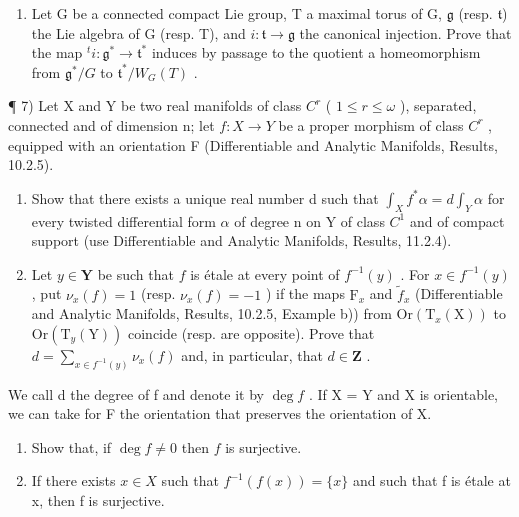 \begin{enumerate}
\def\labelenumi{\arabic{enumi})}
\setcounter{enumi}{5}
\tightlist
\item
  Let G be a connected compact Lie group, T a maximal torus of G, \(\mathfrak{g}\) (resp. \(\mathfrak{t}\)) the Lie algebra of G (resp. T), and \(i : \mathfrak{t} \to \mathfrak{g}\) the canonical injection. Prove that the map \(^{t}i : \mathfrak{g}^{*} \to \mathfrak{t}^{*}\) induces by passage to the quotient a homeomorphism from \(\mathfrak{g}^{*}/G\) to \(\mathfrak{t}^{*}/W_{G}(T)\) .
\end{enumerate}

¶ 7) Let X and Y be two real manifolds of class \(C^{r}\) ( \(1 \leq r \leq \omega\) ), separated, connected and of dimension n; let \(f : X \to Y\) be a proper morphism of class \(C^{r}\) , equipped with an orientation F (Differentiable and Analytic Manifolds, Results, 10.2.5).

\begin{enumerate}
\def\labelenumi{\alph{enumi})}
\item
  Show that there exists a unique real number d such that \(\int_{X} f^{*}\alpha = d\int_{Y}\alpha\) for every twisted differential form \(\alpha\) of degree n on Y of class \(C^{1}\) and of compact support (use Differentiable and Analytic Manifolds, Results, 11.2.4).
\item
  Let \(y \in \mathbf{Y}\) be such that \(f\) is étale at every point of \(f^{-1}(y)\) . For \(x \in f^{-1}(y)\) , put \(\nu_x(f) = 1\) (resp. \(\nu_x(f) = -1\) ) if the maps \(\mathrm{F}_x\) and \(\tilde{f}_x\) (Differentiable and Analytic Manifolds, Results, 10.2.5, Example b)) from \(\mathrm{Or}(\mathrm{T}_x(\mathrm{X}))\) to \(\mathrm{Or}(\mathrm{T}_y(\mathrm{Y}))\) coincide (resp. are opposite). Prove that \(d = \sum_{x \in f^{-1}(y)} \nu_x(f)\) and, in particular, that \(d \in \mathbf{Z}\) .
\end{enumerate}

We call d the degree of f and denote it by \(\deg f\) . If X = Y and X is orientable, we can take for F the orientation that preserves the orientation of X.

\begin{enumerate}
\def\labelenumi{\alph{enumi})}
\setcounter{enumi}{2}
\item
  Show that, if \(\deg f \neq 0\) then \(f\) is surjective.
\item
  If there exists \(x \in X\) such that \(f^{-1}(f(x)) = \{x\}\) and such that f is étale at x, then f is surjective.
\end{enumerate}

